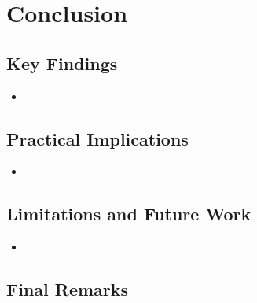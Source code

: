 \section{Conclusion}
\label{sec:conclusion}


\subsection{Key Findings}

\begin{itemize}
    \item 
\end{itemize}

\subsection{Practical Implications}

\begin{itemize}
    \item 
\end{itemize}

\subsection{Limitations and Future Work}

\begin{itemize}
    \item 
\end{itemize}

\subsection{Final Remarks}

